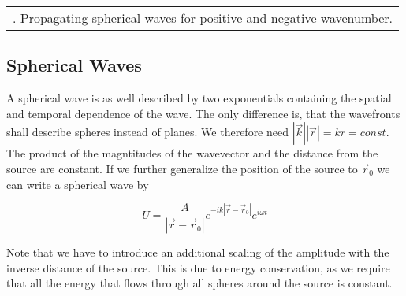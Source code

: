 \documentclass[letterpaper,10pt,english]{sphinxmanual}
\begin{document}
\begin{savenotes}\sphinxattablestart
\centering
\begin{tabulary}{\linewidth}[t]{|T|}
\hline
\sphinxstyletheadfamily 
{}
\\
\hline
{} . Propagating spherical waves for positive and negative wavenumber.
\\
\hline
\end{tabulary}
\par
\sphinxattableend\end{savenotes}


\subsection{Spherical Waves}
\label{\detokenize{snippets/Wave Explorer:Spherical-Waves}}
A spherical wave is as well described by two exponentials containing the spatial and temporal dependence of the wave. The only difference is, that the wavefronts shall describe spheres instead of planes. We therefore need \(|\vec{k}||\vec{r}|=k r=const\). The product of the magntitudes of the wavevector and the distance from the source are constant. If we further generalize the position of the source to \(\vec{r}_{0}\) we can write a spherical wave by

\begin{equation}
U=\frac{A}{|\vec{r}-\vec{r}_{0}|}e^{-i k|\vec{r}-\vec{r}_{0}|} e^{i\omega t}
\end{equation}

Note that we have to introduce an additional scaling of the amplitude with the inverse distance of the source. This is due to energy conservation, as we require that all the energy that flows through all spheres around the source is constant.

{
\begin{sphinxVerbatim}[commandchars=\\\{\}]
\llap{\color{nbsphinxin}[13]:\,\hspace{\fboxrule}\hspace{\fboxsep}} 
    \PYG{p}{[}\PYG{p}{]}
     
\end{sphinxVerbatim}
}
\end{document}
